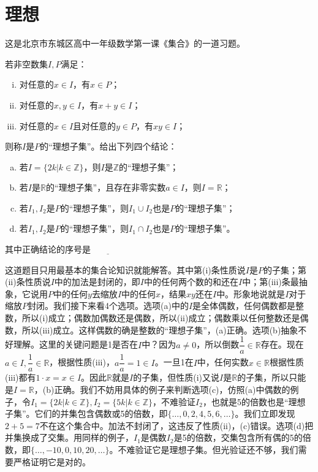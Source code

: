 \documentclass[b5paper]{ctexart}
\begin{document}
\section{理想}

这是北京市东城区高中一年级数学第一课《集合》的一道习题。

\begin{mdframed}
若非空数集$I, P$满足：

\begin{enumerate}[(i)]
\item 对任意的$x \in I$，有$x \in P$；
\item 对任意的$x, y \in I$，有$x + y \in I$；
\item 对任意的$x \in I$且对任意的$y \in P$，有$xy \in I$；
\end{enumerate}

则称$I$是$P$的“理想子集”。给出下列四个结论：

\begin{enumerate}[(a)]
\item 若$I = \{2k | k \in \mathbb{Z} \}$，则$I$是$\mathbb{Z}$的“理想子集”；
\item 若$I$是$\mathbb{R}$的“理想子集”，且存在非零实数$a \in I$，则$I = \mathbb{R}$；
\item 若$I_1, I_2$是$P$的“理想子集”，则$I_1 \cup I_2$也是$P$的“理想子集”；
\item 若$I_1, I_2$是$P$的“理想子集”，则$I_1 \cap I_2$也是$P$的“理想子集”。
\end{enumerate}

其中正确结论的序号是$\underline{\qquad \qquad}$

\end{mdframed}

这道题目只用最基本的集合论知识就能解答。其中第(i)条性质说$I$是$P$的子集；第(ii)条性质说$I$中的加法是封闭的，即$I$中的任何两个数的和还在$I$中；第(iii)条最抽象，它说用$P$中的任何$y$去缩放$I$中的任何$x$，结果$xy$还在$I$中。形象地说就是$I$对于缩放$P$封闭。我们接下来看4个选项。选项(a)中的$I$是全体偶数，任何偶数都是整数，所以(i)成立；偶数加偶数还是偶数，所以(ii)成立；偶数乘以任何整数还是偶数，所以(iii)成立。这样偶数的确是整数的“理想子集”，(a)正确。选项(b)抽象不好理解。这里的关键问题是1是否在$I$中？因为$a \ne 0$，所以倒数$\dfrac{1}{a} \in \mathbb{R}$存在。现在$a \in I, \dfrac{1}{a} \in \mathbb{R}$，根据性质(iii)，$a\dfrac{1}{a} = 1 \in I$。一旦1在$I$中，任何实数$x \in \mathbb{R}$根据性质(iii)都有$1 \cdot x = x \in I$。因此$\mathbb{R}$就是$I$的子集，但性质(i)又说$I$是$\mathbb{R}$的子集，所以只能是$I = \mathbb{R}$，(b)正确。我们不妨用具体的例子来判断选项(c)，仿照(a)中偶数的例子，令$I_1 = \{2k | k \in \mathbb{Z} \}, I_2 = \{5k | k \in \mathbb{Z} \}$，不难验证$I_2$，也就是5的倍数也是“理想子集”。它们的并集包含偶数或5的倍数，即$\{ \dotsc, 0, 2, 4, 5, 6, \dotsc\}$。我们立即发现$2 + 5 = 7$不在这个集合中。加法不封闭了，这违反了性质(ii)，(c)错误。选项(d)把并集换成了交集。用同样的例子，$I_1$是偶数$I_2$是5的倍数，交集包含所有偶的5的倍数，即$\{\dotsc, -10, 0, 10, 20, \dotsc\}$。不难验证它是理想子集。但光验证还不够，我们需要严格证明它是对的。
\end{document}
